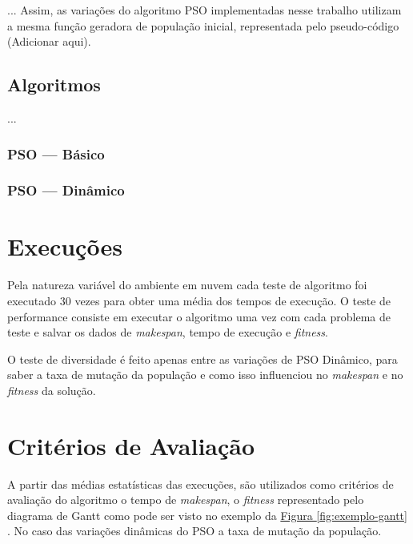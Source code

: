         

        ...
        Assim, as variações do algoritmo PSO implementadas nesse trabalho utilizam a mesma função geradora de população inicial, representada pelo pseudo-código   (Adicionar aqui).


    \subsection{Algoritmos}
            ...

        \subsubsection{PSO — Básico}

        \subsubsection{PSO — Dinâmico}

    



\section{Execuções}
    Pela natureza variável do ambiente em nuvem cada teste de algoritmo foi executado 30 vezes para obter uma média dos tempos de execução. O teste de performance consiste em executar o algoritmo uma vez com cada problema de teste e salvar os dados de \textit{makespan}, tempo de execução e \textit{fitness}.

    O teste de diversidade é feito apenas entre as variações de PSO Dinâmico, para saber a taxa de mutação da população e como isso influenciou no \textit{makespan} e no \textit{fitness} da solução.



\section{Critérios de Avaliação}
    A partir das médias estatísticas das execuções, são utilizados como critérios de avaliação do algoritmo o tempo de \textit{makespan}, o \textit{fitness} representado pelo diagrama de Gantt como pode ser visto no exemplo da 
    \hyperref[fig:exemplo-gantt]{Figura \ref{fig:exemplo-gantt}}
    . No caso das variações dinâmicas do PSO a taxa de mutação da população.

